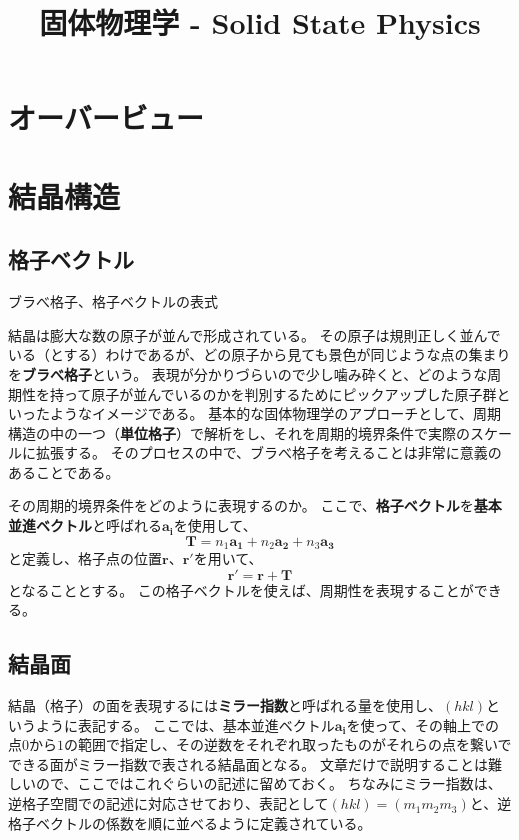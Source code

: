 \documentclass[a4paper]{jsreport}
\title{固体物理学 - Solid State Physics}
\begin{document}
    \maketitle

    \tableofcontents

    \chapter{オーバービュー}
    \chapter{結晶構造}
        \section{格子ベクトル}
            ブラべ格子、格子ベクトルの表式\par
            結晶は膨大な数の原子が並んで形成されている。
            その原子は規則正しく並んでいる（とする）わけであるが、どの原子から見ても景色が同じような点の集まりを\textbf{ブラべ格子}という。
            表現が分かりづらいので少し噛み砕くと、どのような周期性を持って原子が並んでいるのかを判別するためにピックアップした原子群といったようなイメージである。
            基本的な固体物理学のアプローチとして、周期構造の中の一つ（\textbf{単位格子}）で解析をし、それを周期的境界条件で実際のスケールに拡張する。
            そのプロセスの中で、ブラべ格子を考えることは非常に意義のあることである。\par
            その周期的境界条件をどのように表現するのか。
            ここで、\textbf{格子ベクトル}を\textbf{基本並進ベクトル}と呼ばれる$\boldsymbol{a_i}$を使用して、
            \begin{equation} \label{eq:21a}
                \boldsymbol{T} = n_1 \boldsymbol{a_1} + n_2 \boldsymbol{a_2} + n_3 \boldsymbol{a_3}
            \end{equation}
            と定義し、格子点の位置$\boldsymbol{r}$、$\boldsymbol{r'}$を用いて、
            \begin{equation}
                \boldsymbol{r'} = \boldsymbol{r} + \boldsymbol{T}
            \end{equation}
            となることとする。
            この格子ベクトルを使えば、周期性を表現することができる。

        \section{結晶面}
            結晶（格子）の面を表現するには\textbf{ミラー指数}と呼ばれる量を使用し、$(hkl)$というように表記する。
            ここでは、基本並進ベクトル$\boldsymbol{a_i}$を使って、その軸上での点$0$から$1$の範囲で指定し、その逆数をそれぞれ取ったものがそれらの点を繋いでできる面がミラー指数で表される結晶面となる。
            文章だけで説明することは難しいので、ここではこれぐらいの記述に留めておく。
            ちなみにミラー指数は、逆格子空間での記述に対応させており、表記として$(hkl) = (m_1m_2m_3)$と、逆格子ベクトルの係数を順に並べるように定義されている。
\end{document}
